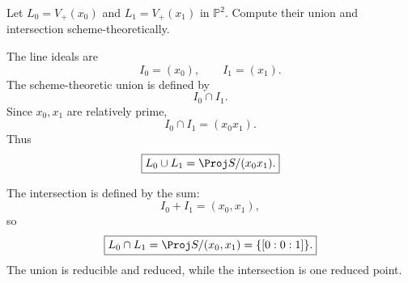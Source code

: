 \begin{problem}\label{prob:vi37-07}
Let \(L_0=V_+(x_0)\) and \(L_1=V_+(x_1)\) in \(\mathbb P^2\). Compute their union and intersection scheme-theoretically.
\end{problem}

\ifdefined\FullProblemDossiers
\begin{solution}
The line ideals are
\[
I_0=(x_0),
\qquad
I_1=(x_1).
\]
The scheme-theoretic union is defined by
\[
I_0\cap I_1.
\]
Since \(x_0,x_1\) are relatively prime,
\[
I_0\cap I_1=(x_0x_1).
\]
Thus
\[
\boxed{
L_0\cup L_1
=
\Proj S/(x_0x_1).
}
\]

The intersection is defined by the sum:
\[
I_0+I_1=(x_0,x_1),
\]
so
\[
\boxed{
L_0\cap L_1
=
\Proj S/(x_0,x_1)
=
\{[0:0:1]\}.
}
\]
The union is reducible and reduced, while the intersection is one reduced point.
\end{solution}
\fi
